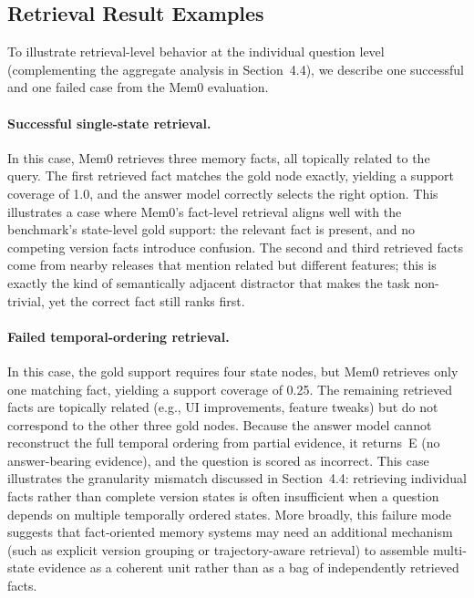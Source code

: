 \subsection{Retrieval Result Examples}

To illustrate retrieval-level behavior at the individual question level (complementing the aggregate analysis in Section~4.4), we describe one successful and one failed case from the Mem0 evaluation.

\paragraph{Successful single-state retrieval.}
In this case, Mem0 retrieves three memory facts, all topically related to the query. The first retrieved fact matches the gold node exactly, yielding a support coverage of 1.0, and the answer model correctly selects the right option. This illustrates a case where Mem0's fact-level retrieval aligns well with the benchmark's state-level gold support: the relevant fact is present, and no competing version facts introduce confusion. The second and third retrieved facts come from nearby releases that mention related but different features; this is exactly the kind of semantically adjacent distractor that makes the task non-trivial, yet the correct fact still ranks first.

\paragraph{Failed temporal-ordering retrieval.}
In this case, the gold support requires four state nodes, but Mem0 retrieves only one matching fact, yielding a support coverage of 0.25. The remaining retrieved facts are topically related (e.g., UI improvements, feature tweaks) but do not correspond to the other three gold nodes. Because the answer model cannot reconstruct the full temporal ordering from partial evidence, it returns~E (no answer-bearing evidence), and the question is scored as incorrect. This case illustrates the granularity mismatch discussed in Section~4.4: retrieving individual facts rather than complete version states is often insufficient when a question depends on multiple temporally ordered states. More broadly, this failure mode suggests that fact-oriented memory systems may need an additional mechanism (such as explicit version grouping or trajectory-aware retrieval) to assemble multi-state evidence as a coherent unit rather than as a bag of independently retrieved facts.

